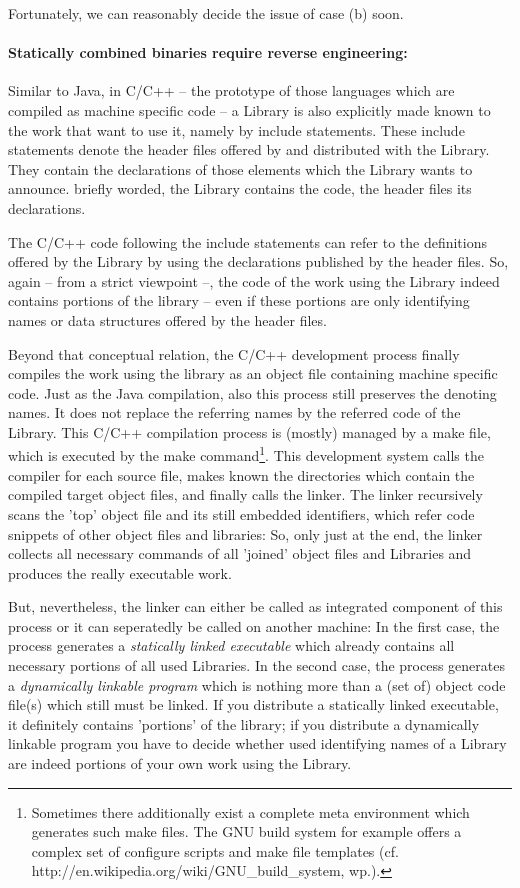 Fortunately, we can reasonably decide the issue of case (b) soon.

\paragraph{Statically combined binaries require reverse engineering:} 

Similar to Java, in C/C++ -- the prototype of those languages which are compiled
as machine specific code -- a Library is also explicitly made known to the work
that want to use it, namely by include statements. These include statements
denote the header files offered by and distributed with the Library. They
contain the declarations of those elements which the Library wants to announce.
briefly worded, the Library contains the code, the header files its
declarations.

The C/C++ code following the include statements can refer to the definitions
offered by the Library by using the declarations published by the header files.
So, again -- from a strict viewpoint --, the code of the work using the Library
indeed contains portions of the library -- even if these portions are only
identifying names or data structures offered by the header files.

Beyond that conceptual relation, the C/C++ development process finally compiles
the work using the library as an object file containing machine specific code.
Just as the Java compilation, also this process still preserves the denoting
names. It does not replace the referring names by the referred code of the
Library. This C/C++ compilation process is (mostly) managed by a make file,
which is executed by the make command\footnote{Sometimes there additionally
exist a complete meta environment which generates such make files. The GNU build
system for example offers a complex set of configure scripts and make file
templates (cf. http://en.wikipedia.org/wiki/GNU\_build\_system, wp.).}. This
development system calls the compiler for each source file, makes known the
directories which contain the compiled target object files, and finally calls
the linker. The linker recursively scans the 'top' object file and its still
embedded identifiers, which refer code snippets of other object files and
libraries: So, only just at the end, the linker collects all necessary commands
of all 'joined' object files and Libraries and produces the really executable
work.

But, nevertheless, the linker can either be called as integrated component of
this process or it can seperatedly be called on another machine: In the first
case, the process generates a \emph{statically linked executable} which already
contains all necessary portions of all used Libraries. In the second case, the
process generates a \emph{dynamically linkable program} which is nothing more
than a (set of) object code file(s) which still must be linked. If you
distribute a statically linked executable, it definitely contains 'portions' of
the library; if you distribute a dynamically linkable program you have to decide
whether used identifying names of a Library are indeed portions of your own work
using the Library.


